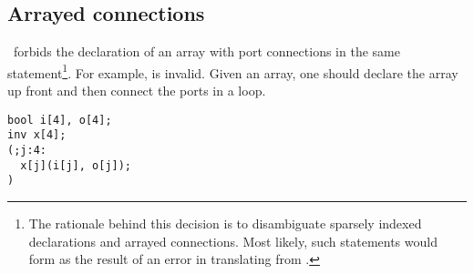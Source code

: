 \subsection{Arrayed connections}
\label{sec:connections:array}

\hac\ forbids the declaration of an array with port connections
in the same statement\footnote{The rationale behind this decision
is to disambiguate sparsely indexed declarations and arrayed connections.
Most likely, such statements would form as the result of an error
in translating from \CAST.}.  
For example,  is invalid.  
Given an array, one should declare the array up front and then
connect the ports in a loop.  

\begin{verbatim}
bool i[4], o[4];
inv x[4];
(;j:4:
  x[j](i[j], o[j]);
)
\end{verbatim}

